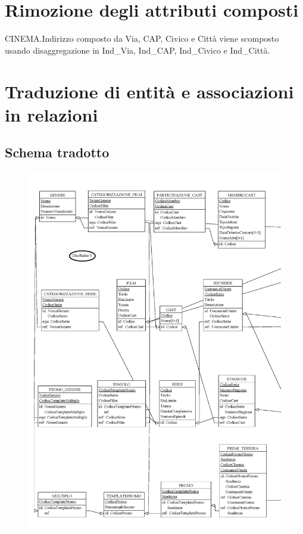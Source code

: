 \documentclass[a4paper,12pt]{report}
\begin{document}
\section{Rimozione degli attributi composti}
CINEMA.Indirizzo composto da Via, CAP, Civico e Città viene scomposto usando disaggregazione in Ind{\_}Via, Ind{\_}CAP, Ind{\_}Civico e Ind{\_}Città.
\section{Traduzione di entità e associazioni in relazioni}
\subsection{Schema tradotto}
\begin{figure}[H]
	\centering
	\includegraphics[width=350pt]{ER/schemalogico/logicsx.png}
\end{figure}
\end{document}
